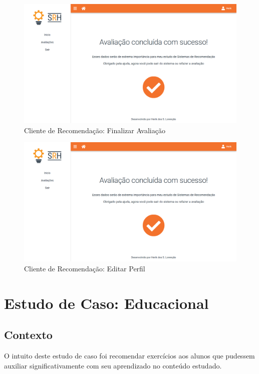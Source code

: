 \begin{figure}[H]
	\centering
	\includegraphics[width=.9\linewidth]{imagens/clientFinalizar.png}
	\caption[Cliente de Recomendação: Finalizar Avaliação]{Cliente de Recomendação: Finalizar Avaliação}
    \label{fig:clienteAvaliacaoFinalizar}
\end{figure}

\begin{figure}[H]
	\centering
	\includegraphics[width=.9\linewidth]{imagens/clientFinalizar.png}
	\caption[Cliente de Recomendação: Editar Perfil]{Cliente de Recomendação: Editar Perfil}
    \label{fig:clienteEditarPerfil}
\end{figure}

\section{Estudo de Caso: Educacional}

\subsection{Contexto}

O intuito deste estudo de caso foi recomendar exercícios aos alunos que pudessem auxiliar significativamente com seu aprendizado no conteúdo estudado.
\newline

